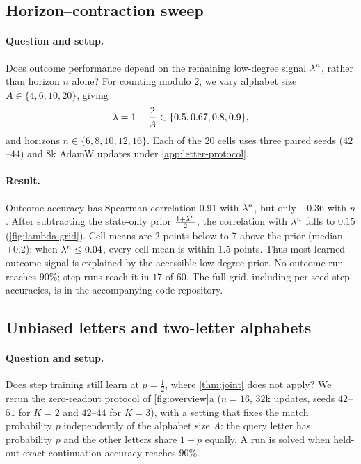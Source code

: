 \subsection{Horizon--contraction sweep}
\label{app:exp-lambda}
\paragraph{Question and setup.} Does outcome performance depend on the remaining low-degree signal $\lambda^n$, rather than horizon $n$ alone?
For counting modulo $2$, we vary alphabet size $A\in\{4,6,10,20\}$, giving
\[
 \lambda=1-\frac{2}{A}\in\{0.5,0.67,0.8,0.9\},
\]
and horizons $n\in\{6,8,10,12,16\}$. Each of the $20$ cells uses three paired seeds ($42$--$44$) and $8$k AdamW updates
under \cref{app:letter-protocol}.

\paragraph{Result.} Outcome accuracy has Spearman correlation $0.91$ with $\lambda^n$, but only $-0.36$ with $n$.
After subtracting the state-only prior $\frac{1+\lambda^n}{2}$, the correlation with $\lambda^n$ falls to $0.15$ (\cref{fig:lambda-grid}).
Cell means are $2$ points below to $7$ above the prior (median $+0.2$); when $\lambda^n\le0.04$, every cell mean is within $1.5$ points.
Thus most learned outcome signal is explained by the accessible low-degree prior. No outcome run reaches $90\%$;
step runs reach it in $17$ of $60$. The full grid, including per-seed step accuracies, is in the accompanying code repository.

\subsection{Unbiased letters and two-letter alphabets}
\label{app:p-half}
\paragraph{Question and setup.} Does step training still learn at $p=\frac12$, where \cref{thm:joint} does not apply? We rerun the zero-readout
protocol of \cref{fig:overview}a ($n=16$, $32$k updates, seeds $42$--$51$ for $K=2$ and $42$--$44$ for $K=3$), with a setting that fixes the match probability $p$
independently of the alphabet size $A$: the query letter has probability $p$ and the other letters share $1-p$ equally. A run is solved when held-out
exact-continuation accuracy reaches $90\%$.

